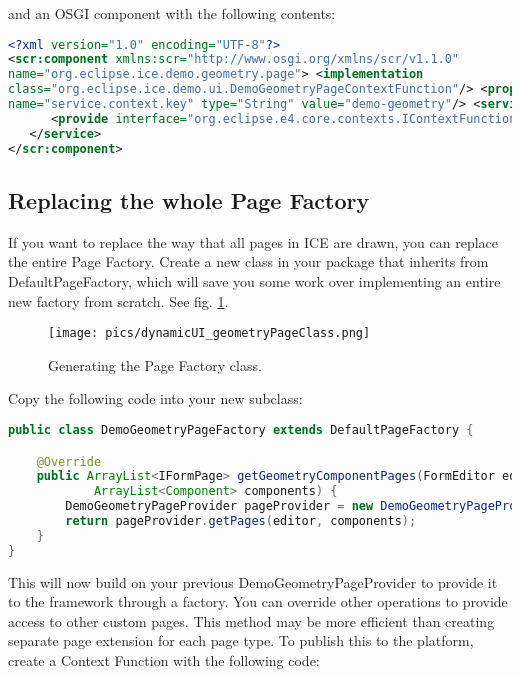 and an OSGI component with the following contents:

\begin{lstlisting}[language=xml]
<?xml version="1.0" encoding="UTF-8"?>
<scr:component xmlns:scr="http://www.osgi.org/xmlns/scr/v1.1.0"
name="org.eclipse.ice.demo.geometry.page"> <implementation
class="org.eclipse.ice.demo.ui.DemoGeometryPageContextFunction"/> <property
name="service.context.key" type="String" value="demo-geometry"/> <service>
      <provide interface="org.eclipse.e4.core.contexts.IContextFunction"/>
   </service>
</scr:component>
\end{lstlisting}

\subsection{Replacing the whole Page Factory}

If you want to replace the way that all pages in ICE are drawn, you can replace
the entire Page Factory.  Create a new class in your package that inherits from
DefaultPageFactory, which will save you some work over implementing an entire
new factory from scratch. See fig. \ref{fig:icegeometryPageClass}.

\begin{figure}[h]
\texttt{[image: pics/dynamicUI\_geometryPageClass.png]}
\caption{Generating the Page Factory class.}
\label{fig:icegeometryPageClass}
\end{figure}

Copy the following code into your new subclass:

\begin{lstlisting}[language=java]
public class DemoGeometryPageFactory extends DefaultPageFactory {

    @Override
    public ArrayList<IFormPage> getGeometryComponentPages(FormEditor editor,
            ArrayList<Component> components) {
        DemoGeometryPageProvider pageProvider = new DemoGeometryPageProvider();
        return pageProvider.getPages(editor, components);
    }
}
\end{lstlisting}

This will now build on your previous DemoGeometryPageProvider to provide it to
the framework through a factory. You can override other operations to provide
access to other custom pages. This method may be more efficient than creating
separate page extension for each page type. To publish this to the platform,
create a Context Function with the following code:

